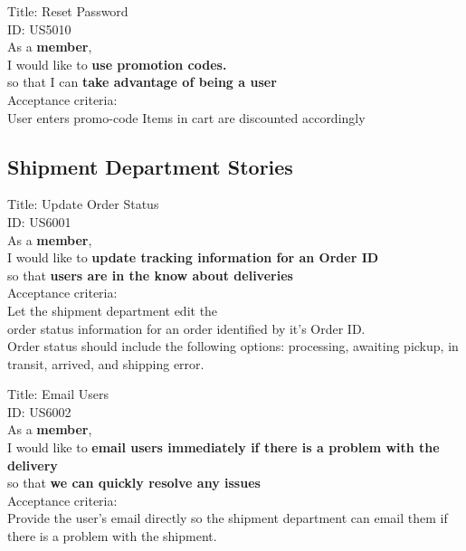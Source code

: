 \documentclass{article}
\begin{document}
\begin{framed}
\noindent
Title:  Reset Password \\
ID: US5010 \\
As a \textbf{member},\\
\textbullet  \quad \quad I would like to \textbf{use promotion codes.}\\
\textbullet  \quad \quad so that I can \textbf{take advantage of being a user}\\
Acceptance criteria: \\
\textbullet  \quad \quad User enters promo-code
\textbullet  \quad \quad Items in cart are discounted accordingly
\end{framed}


\subsection{Shipment Department Stories}
\begin{framed}
\noindent
Title:  Update Order Status \\
ID: US6001 \\
As a \textbf{member},\\
\textbullet  \quad \quad I would like to \textbf{update tracking information for an Order ID}\\ 
\textbullet  \quad \quad so that \textbf{users are in the know about deliveries}\\
Acceptance criteria: \\
\textbullet  \quad \quad Let the shipment department edit the\\ order status information for an order identified by it's Order ID.\\
\textbullet  \quad \quad Order status should include the following options: processing, awaiting pickup, in transit, arrived, and shipping error.
\end{framed}


\begin{framed}
\noindent
Title:  Email Users \\
ID: US6002 \\
As a \textbf{member},\\
\textbullet  \quad \quad I would like to \textbf{email users immediately if there is a problem with the delivery}\\ 
\textbullet  \quad \quad so that \textbf{we can quickly resolve any issues}\\
Acceptance criteria: \\
\textbullet  \quad \quad Provide the user's email directly so the shipment department can email them if there is a problem with the shipment.
\end{framed}
\end{document}
